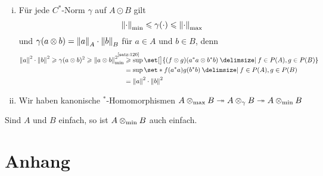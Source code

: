 \begin{bemerkung}
    \begin{enumerate}[(i)]
        \item Für jede $C^*$-Norm $\gamma$ auf $A \odot B$ gilt 
        \[
            \norm*{\cdot}_{\min} \le \gamma(\cdot ) \le \norm*{\cdot}_{\max}
        \]
        und $\gamma(a \otimes b) = \norm*{a}_A \cdot \norm*{b}_B$ für $a \in A$ und $b \in B$, denn
        \begin{align}
            \norm*{a}^2 \cdot \norm*{b}^2 \ge \gamma(a \otimes b)^2 \ge \norm*{a \otimes b}_{\min}^2 &\StackTextClap{\ref{satz:120}}{\ge} \sup \set[\big]{(f \otimes g) \enbrace*{a^* a \otimes b^*b} \given f \in P(A), g \in P(B)} \\
            &= \sup \set*{f (a^*a) g(b^*b) \given f \in P(A), g \in P(B)} \\
            &= \norm*{a}^2 \cdot \norm*{b}^2
        \end{align}
        \item Wir haben kanonische $^*$-Homomorphismen 
        $A \tensormax B \twoheadrightarrow A \otimes_\gamma B \twoheadrightarrow A \tensormin B$
    \end{enumerate}
\end{bemerkung}

\begin{korollar}[{name=[minimales Tensorprodukt erhält Einfachheit]}]
    Sind $A$ und $B$ einfach, so ist $A \tensormin B$ auch einfach.
\end{korollar}
\begin{beweis}
    
\end{beweis}



\cleardoubleoddemptypage
{}
\setcounter{page}{1}
\cleardoubleoddemptypage
\appendix

\section{Anhang} %
\label{sec:anhang}

\printindex
\printbibliography
\listoffigures
\todototoc
{}


